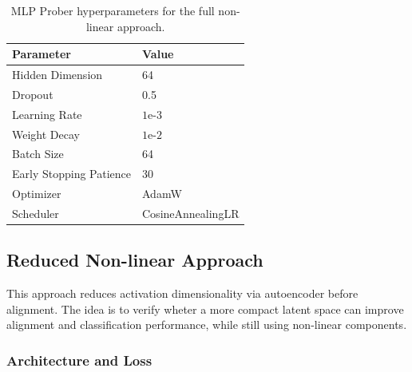 \begin{table}[H]
\centering
\begin{tabularx}{\textwidth}{Xl}
    \toprule
    \textbf{Parameter} & \textbf{Value} \\
    \midrule
    Hidden Dimension & 64 \\
    Dropout & 0.5 \\
    Learning Rate & $1\text{e-}3$ \\
    Weight Decay & $1\text{e-}2$ \\
    Batch Size & 64 \\
    Early Stopping Patience & 30 \\
    Optimizer & AdamW \\
    Scheduler & CosineAnnealingLR \\
    \bottomrule
\end{tabularx}
\caption{MLP Prober hyperparameters for the full non-linear approach.}
\label{tab:hyperparams-prober-clean}
\end{table}

\subsection{Reduced Non-linear Approach}

This approach reduces activation dimensionality via autoencoder before alignment. The idea is to verify wheter a more compact latent space can improve alignment and classification performance, while still using non-linear components.

\subsubsection{Architecture and Loss}

